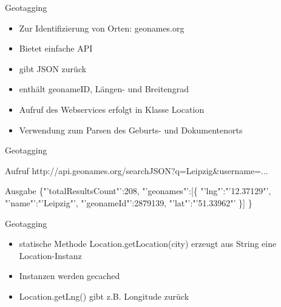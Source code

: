 \documentclass[12pt]{beamer}
\begin{document}
\begin{large}
\begin{frame}{Geotagging}
\begin{itemize}
  \item Zur Identifizierung von Orten: geonames.org
  \item Bietet einfache API
  \item gibt JSON zurück
  \item enthält geonameID, Längen- und Breitengrad
  \item Aufruf des Webservices erfolgt in Klasse Location
  \item Verwendung zum Parsen des Geburts- und Dokumentenorts
 \end{itemize}
\end{frame}
 
\begin{frame}{Geotagging}
 \vspace*{\fill}
 \begin{block}{Aufruf}
 \normalsize http://api.geonames.org/searchJSON?q=Leipzig\&username=...
 \end{block}
 
 \begin{block}{Ausgabe}
 \normalsize \{"'totalResultsCount"':208,
  \newline
  \hspace*{0.5cm}"'geonames"':[\{
  \newline
  \hspace*{1cm}"'lng"':"'12.37129"',
  \newline
  \hspace*{1cm}"'name"':"'Leipzig"',
  \newline  
  \hspace*{1cm}"'geonameId"':2879139,
  \newline
  \hspace*{1cm}"'lat"':"'51.33962"'
  \newline
  \hspace*{0.5cm}\}]
  \newline
  \}
 \end{block}
\end{frame} 
 
\begin{frame}{Geotagging}
 \begin{itemize}
  \item statische Methode Location.getLocation(city) erzeugt aus String eine Location-Instanz
  \item Instanzen werden gecached
  \item Location.getLng() gibt z.B. Longitude zurück
 \end{itemize}
 

\end{frame}
\end{large}
\end{document}
